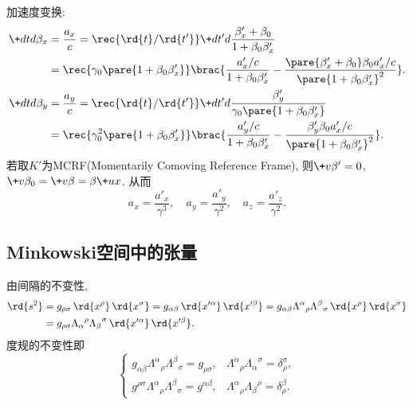\documentclass[hidelinks]{ctexart}
\begin{document}
\begin{cenum}
    \item 加速度变换:
    \begin{align*}
        \+dtd{\beta_x} &= \frac{a_x}{c} = \rec{\rd{t}/\rd{t'}} \+d{t'}d{} \frac{\beta'_x + \beta_0}{1+\beta_0 \beta'_x} \\
        &= \rec{\gamma_0 \pare{1+\beta_0 \beta'_x}} \brac{\frac{a'_x / c}{1+\beta_0 \beta'_x} - \frac{\pare{\beta'_x + \beta_0}\beta_0 a'_x / c}{\pare{1+\beta_0\beta'_x}^2}}. \\
        \+dtd{\beta_y} &= \frac{a_y}{c} = \rec{\rd{t}/\rd{t'}} \+d{t'}d{} \frac{\beta'_y}{\gamma_0\pare{1+\beta_0 \beta'_x}} \\
        &= \rec{\gamma^2_0 \pare{1+\beta_0 \beta'_x}}\brac{\frac{a'_y /c}{1+\beta_0 \beta'_x} - \frac{\beta'_y \beta_0 a'_x / c}{\pare{1+\beta_0\beta'_x}^2}}.
    \end{align*}
    若取$K'$为MCRF(Momentarily Comoving Reference Frame), 则$\+v\beta' = 0$, $\+v\beta_0 = \+v\beta = \beta\+ux$. 从而
    \[ a_x = \frac{a'_x}{\gamma^3},\quad a_y = \frac{a'_y}{\gamma^2},\quad a_z = \frac{a'_z}{\gamma^2}. \]
\end{cenum}



\subsection{Minkowski空间中的张量} %
\label{sub:minkowski空间中的张量}

由间隔的不变性,
\begin{align*}
    \rd{s^2} &= g_{\rho\sigma}\,\rd{x^\rho}\,\rd{x^\sigma} = g_{\alpha\beta} \,\rd{x'^\alpha}\,\rd{x'^\beta} = g_{\alpha\beta}{\Lambda^\alpha}_\rho {\Lambda^\beta}_\sigma \,\rd{x^\rho}\,\rd{x^\sigma} \\
    &=  g_{\rho\sigma}{\Lambda_\alpha}^\rho {\Lambda_\beta}^\sigma \,\rd{x'^\alpha}\,\rd{x'^\beta}.
\end{align*}
度规的不变性即
\[ \begin{cases}
    g_{\alpha\beta}{\Lambda^\alpha}_\rho {\Lambda^\beta}_\sigma = g_{\rho\sigma}, & {\Lambda^\alpha}_\rho {\Lambda_\alpha}^\sigma = \delta_\rho^\sigma, \\
    g^{\rho\sigma}{\Lambda^\alpha}_\rho {\Lambda^\beta}_\sigma = g^{\alpha\beta}, & {\Lambda^\alpha}_\rho {\Lambda_\beta}^\rho = \delta_\rho^\beta.
\end{cases} \]
\end{document}
